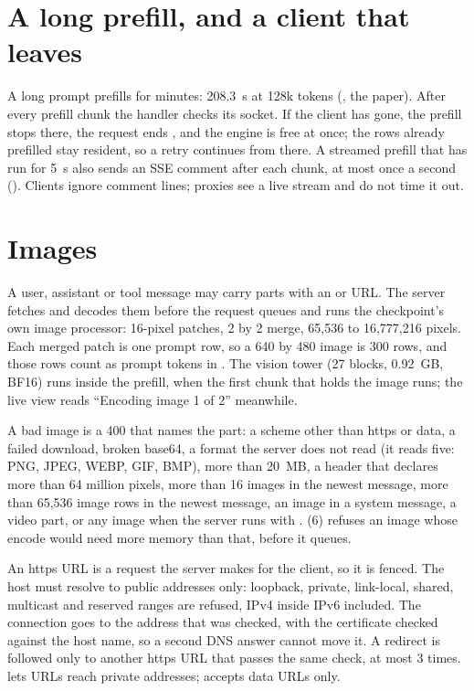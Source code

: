\section{A long prefill, and a client that leaves}

A long prompt prefills for minutes: 208.3~s at 128k tokens (\measured, the paper). After every prefill chunk the handler checks its socket. If the client has gone, the prefill stops there, the request ends , and the engine is free at once; the rows already prefilled stay resident, so a retry continues from there. A streamed prefill that has run for 5~s also sends an SSE comment after each chunk, at most once a second (). Clients ignore comment lines; proxies see a live stream and do not time it out.

\section{Images}

A user, assistant or tool message may carry  parts with an  or  URL. The server fetches and decodes them before the request queues and runs the checkpoint's own image processor: 16-pixel patches, 2 by 2 merge, 65,536 to 16,777,216 pixels. Each merged patch is one prompt row, so a 640 by 480 image is 300 rows, and those rows count as prompt tokens in . The vision tower (27 blocks, 0.92~GB, BF16) runs inside the prefill, when the first chunk that holds the image runs; the live view reads \enquote{Encoding image 1 of 2} meanwhile.

A bad image is a 400 that names the part: a scheme other than https or data, a failed download, broken base64, a format the server does not read (it reads five: PNG, JPEG, WEBP, GIF, BMP), more than 20~MB, a header that declares more than 64 million pixels, more than 16 images in the newest message, more than 65,536 image rows in the newest message, an image in a system message, a video part, or any image when the server runs with .  (6) refuses an image whose encode would need more memory than that, before it queues.

An https URL is a request the server makes for the client, so it is fenced. The host must resolve to public addresses only: loopback, private, link-local, shared, multicast and reserved ranges are refused, IPv4 inside IPv6 included. The connection goes to the address that was checked, with the certificate checked against the host name, so a second DNS answer cannot move it. A redirect is followed only to another https URL that passes the same check, at most 3 times.  lets URLs reach private addresses;  accepts data URLs only.

